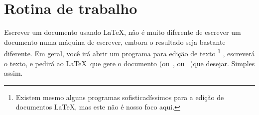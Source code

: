 \section{Rotina de trabalho}

Escrever um documento usando \LaTeX, não é muito diferente de escrever
um documento numa máquina de escrever, embora o resultado seja
bastante diferente. Em geral, você irá abrir um programa para edição
de texto%
\footnote{%
  Existem mesmo alguns programas sofisticadíssimos
  para a edição de documentos \LaTeX, mas este não é nosso foco
  aqui.}%
, escreverá o texto, e pedirá ao \LaTeX\ que gere o
documento  (ou~, ou~ )que
desejar. Simples assim.

